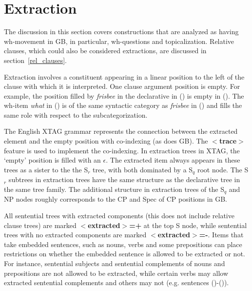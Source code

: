 \chapter{Extraction}
\label{extraction}

The discussion in this section covers constructions that are analyzed
as having wh-movement in GB, in particular, wh-questions and
topicalization. Relative clauses, which could also be considered
extractions, are discussed in section~\ref{rel_clauses}.

Extraction involves a constituent appearing in a linear position to
the left of the clause with which it is interpreted. One clause
argument position is empty. For example, the position filled by
{\it frisbee} in the declarative in () is empty in (). The
wh-item {\it what} in () is of the same syntactic category as
{\it frisbee} in () and fills the same role with respect to the
subcategorization.



The English XTAG grammar represents the connection between the extracted
element and the empty position with co-indexing (as does GB).  The {\bf
$<$trace$>$} feature is used to implement the co-indexing.  In extraction trees
in XTAG, the `empty' position is filled with an {\it $\epsilon$}.  The
extracted item always appears in these trees as a sister to the the S$_{r}$
tree, with both dominated by a S$_{q}$ root node.  The S$_{r}$ subtrees in
extraction trees have the same structure as the declarative tree in the same
tree family.  The additional structure in extraction trees of the S$_{q}$ and
NP nodes roughly corresponds to the CP and Spec of CP positions in GB.

All sentential trees with extracted components (this does not include relative
clause trees) are marked {\bf $<$extracted$>$=+} at the top S node, while
sentential trees with no extracted components are marked {\bf
$<$extracted$>$=-}.  Items that take embedded sentences, such as nouns, verbs
and some prepositions can place restrictions on whether the embedded sentence
is allowed to be extracted or not.  For instance, sentential subjects and
sentential complements of nouns and prepositions are not allowed to be
extracted, while certain verbs may allow extracted sentential complements and
others may not (e.g. sentences ()-()).


